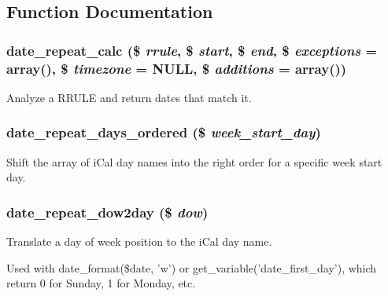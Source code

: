 \subsection{Function Documentation}
\hypertarget{date__repeat_8module_a3d79ef2b99159e6f7bf47560e0fd40f9}{
\subsubsection[{date\_\-repeat\_\-calc}]{\setlength{\rightskip}{0pt plus 5cm}date\_\-repeat\_\-calc (\$ {\em rrule}, \/  \$ {\em start}, \/  \$ {\em end}, \/  \$ {\em exceptions} = {\ttfamily array()}, \/  \$ {\em timezone} = {\ttfamily NULL}, \/  \$ {\em additions} = {\ttfamily array()})}}
\label{date__repeat_8module_a3d79ef2b99159e6f7bf47560e0fd40f9}
Analyze a RRULE and return dates that match it. \hypertarget{date__repeat_8module_af210c31340e410884987c375118cd263}{
\subsubsection[{date\_\-repeat\_\-days\_\-ordered}]{\setlength{\rightskip}{0pt plus 5cm}date\_\-repeat\_\-days\_\-ordered (\$ {\em week\_\-start\_\-day})}}
\label{date__repeat_8module_af210c31340e410884987c375118cd263}
Shift the array of iCal day names into the right order for a specific week start day. \hypertarget{date__repeat_8module_a405d111dc6063ab1a16b0a43e3dbe604}{
\subsubsection[{date\_\-repeat\_\-dow2day}]{\setlength{\rightskip}{0pt plus 5cm}date\_\-repeat\_\-dow2day (\$ {\em dow})}}
\label{date__repeat_8module_a405d111dc6063ab1a16b0a43e3dbe604}
Translate a day of week position to the iCal day name.

Used with date\_\-format(\$date, 'w') or get\_\-variable('date\_\-first\_\-day'), which return 0 for Sunday, 1 for Monday, etc.

